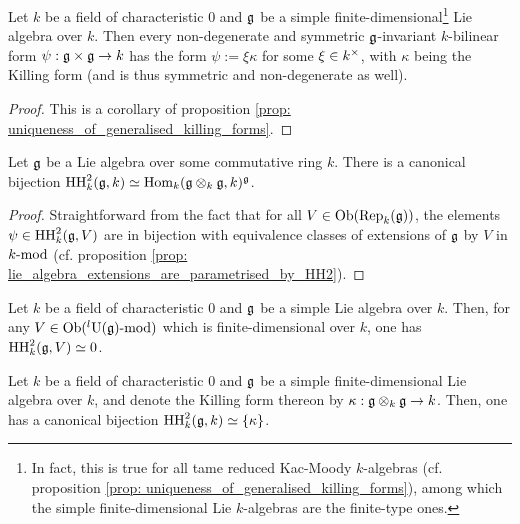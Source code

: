             \begin{proposition} \label{prop: simple_finite_dimensional_lie_algebras_only_have_the_killing_form}
                Let $k$ be a field of characteristic $0$ and $\g$ be a simple finite-dimensional\footnote{In fact, this is true for all tame reduced Kac-Moody $k$-algebras (cf. proposition \ref{prop: uniqueness_of_generalised_killing_forms}), among which the simple finite-dimensional Lie $k$-algebras are the finite-type ones.} Lie algebra over $k$. Then every non-degenerate and symmetric $\g$-invariant $k$-bilinear form $\psi: \g \x \g \to k$ has the form $\psi := \xi \kappa$ for some $\xi \in k^{\x}$, with $\kappa$ being the Killing form (and is thus symmetric and non-degenerate as well).
            \end{proposition}
                \begin{proof}
                    This is a corollary of proposition \ref{prop: uniqueness_of_generalised_killing_forms}.
                \end{proof}
            \begin{lemma} \label{lemma: second_cohomology_parametrises_invariant_bilinear_forms}
                Let $\g$ be a Lie algebra over some commutative ring $k$. There is a canonical bijection $\HH^2_k(\g, k) \cong \Hom_k(\g \tensor_k \g, k)^{\g}$.
            \end{lemma}
                \begin{proof}
                    Straightforward from the fact that for all $V \in \Ob(\Rep_k(\g))$, the elements $\psi \in \HH^2_k(\g, V)$ are in bijection with equivalence classes of extensions of $\g$ by $V$ in $k\mod$ (cf. proposition \ref{prop: lie_algebra_extensions_are_parametrised_by_HH2}).
                \end{proof}
            \begin{lemma} \label{lemma: second_whitehead_lemma}
                \cite[Proposition VII.6.3]{hilton_stammbach_homological_algebra} Let $k$ be a field of characteristic $0$ and $\g$ be a simple Lie algebra over $k$. Then, for any $V \in \Ob({}^l\rmU(\g)\mod)$ which is finite-dimensional over $k$, one has $\HH^2_k(\g, V) \cong 0$.
            \end{lemma}
            \begin{proposition} \label{prop: killing_forms_and_universal_central_extensions}
                Let $k$ be a field of characteristic $0$ and $\g$ be a simple finite-dimensional Lie algebra over $k$, and denote the Killing form thereon by $\kappa: \g \tensor_k \g \to k$. Then, one has a canonical bijection $\HH^2_k(\g, k) \cong \{\kappa\}$.
            \end{proposition}
